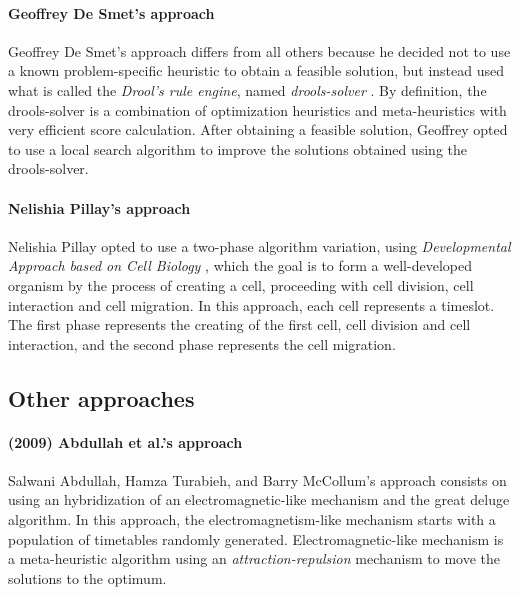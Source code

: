 \paragraph{Geoffrey De Smet's approach}
Geoffrey De Smet's approach \cite{Smet2007} differs from all others because he decided not to use a known problem-specific heuristic to obtain a feasible solution, but instead used what is called the \textit{Drool's rule engine}, named \textit{drools-solver} \cite{Drools}. By definition, the drools-solver is a combination of optimization heuristics and meta-heuristics with very efficient score calculation. After obtaining a feasible solution, Geoffrey opted to use a local search algorithm to improve the solutions obtained using the drools-solver.\\

\paragraph{Nelishia Pillay's approach}
Nelishia Pillay opted to use a two-phase algorithm variation, using \textit{Developmental Approach based on Cell Biology} \cite{Pillay2007}, which the goal is to form a well-developed organism by the process of creating a cell, proceeding with cell division, cell interaction and cell migration. In this approach, each cell represents a timeslot. The first phase represents the creating of the first cell, cell division and cell interaction, and the second phase represents the cell migration.

\subsection{Other approaches}
\label{subsection:OtherAppr}

\paragraph{(2009) Abdullah et al.'s approach}
Salwani Abdullah, Hamza Turabieh, and Barry McCollum's approach \cite{Abdullah2009} consists on using an hybridization of an electromagnetic-like mechanism and the great deluge algorithm. In this approach, the electromagnetism-like mechanism starts with a population of timetables randomly generated. Electromagnetic-like mechanism is a meta-heuristic algorithm using an \textit{attraction-repulsion} mechanism \cite{Javadian2008} to move the solutions to the optimum.\\

